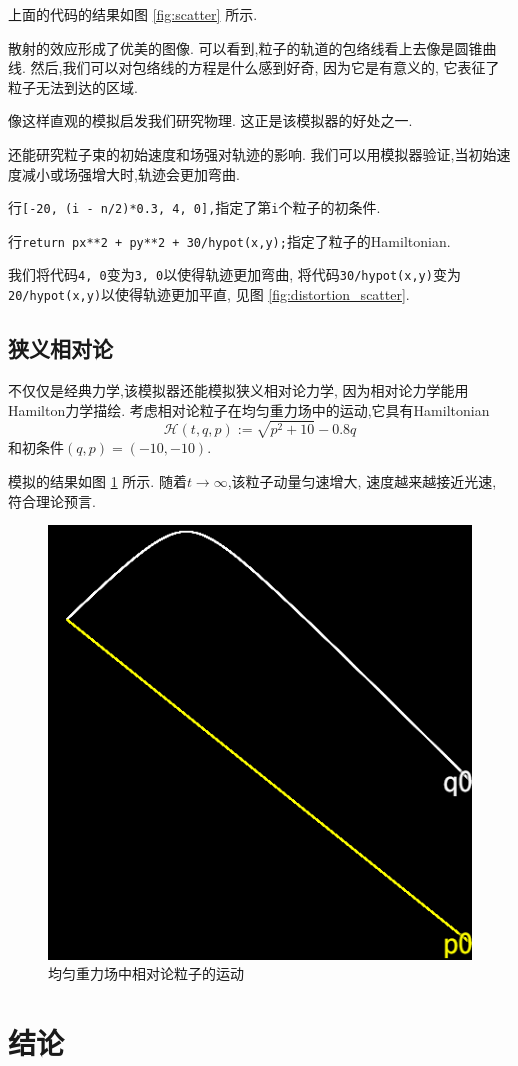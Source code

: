 \documentclass[12pt]{article}
\begin{document}
上面的代码的结果如图 \ref{fig:scatter} 所示.

散射的效应形成了优美的图像.
可以看到,粒子的轨道的包络线看上去像是圆锥曲线.
然后,我们可以对包络线的方程是什么感到好奇,
因为它是有意义的,
它表征了粒子无法到达的区域.

像这样直观的模拟启发我们研究物理.
这正是该模拟器的好处之一.

还能研究粒子束的初始速度和场强对轨迹的影响.
我们可以用模拟器验证,当初始速度减小或场强增大时,轨迹会更加弯曲.

行\texttt{[-20, (i - n/2)*0.3, 4, 0],}指定了第\texttt{i}个粒子的初条件.

行\texttt{return px**2 + py**2 + 30/hypot(x,y);}指定了粒子的Hamiltonian.

我们将代码\texttt{4, 0}变为\texttt{3, 0}以使得轨迹更加弯曲,
将代码\texttt{30/hypot(x,y)}变为\texttt{20/hypot(x,y)}以使得轨迹更加平直,
见图 \ref{fig:distortion_scatter}.

\subsection{狭义相对论}

不仅仅是经典力学,该模拟器还能模拟狭义相对论力学,
因为相对论力学能用Hamilton力学描绘.
考虑相对论粒子在均匀重力场中的运动,它具有Hamiltonian\cite[p. 28]{landau2010fields}
\begin{equation*}
  \mathcal H\left(t,q,p\right):=\sqrt{p^2+10}-0.8q
\end{equation*}
和初条件$\left(q,p\right)=\left(-10,-10\right)$.

模拟的结果如图 \ref{fig:relativity} 所示.
随着$t\rightarrow\infty$,该粒子动量匀速增大,
速度越来越接近光速,
符合理论预言\cite[p. 24]{landau2010fields}.

\begin{figure}[h]
  \centering
  \includegraphics[width=0.25\linewidth]{relativity_gravity.png}
  \caption{均匀重力场中相对论粒子的运动}
  \label{fig:relativity}
\end{figure}

\section{结论}
\end{document}
